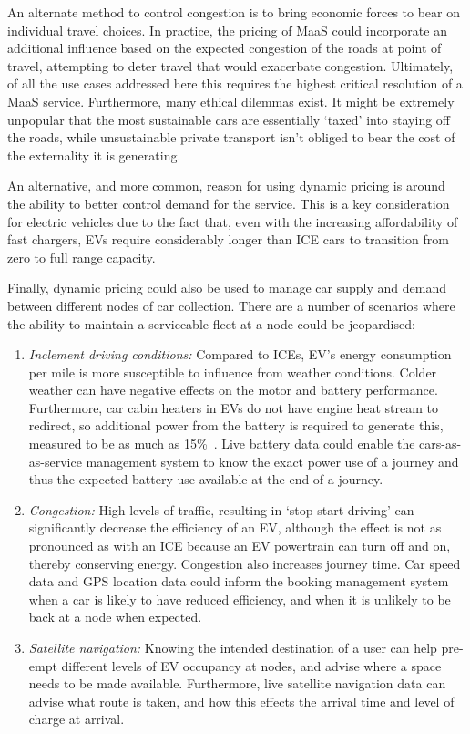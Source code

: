 \documentclass[b5paper,10pt]{article}
\begin{document}
An alternate method to control congestion is to bring economic forces
to bear on individual travel choices. In practice, the pricing of MaaS
could incorporate an additional influence based on the expected
congestion of the roads at point of travel, attempting to deter travel
that would exacerbate congestion. Ultimately, of all the use cases
addressed here this requires the highest critical resolution of a MaaS
service. Furthermore, many ethical dilemmas exist. It might be
extremely unpopular that the most sustainable cars are essentially
`taxed' into staying off the roads, while unsustainable private
transport isn't obliged to bear the cost of the externality it is
generating.

An alternative, and more common, reason for using dynamic pricing is
around the ability to better control demand for the service. This is a
key consideration for electric vehicles due to the fact that, even
with the increasing affordability of fast chargers, EVs require
considerably longer than ICE cars to transition from zero to full
range capacity.

Finally, dynamic pricing could also be used to manage car supply and
demand between different nodes of car collection. There are a number
of scenarios where the ability to maintain a serviceable fleet at a
node could be jeopardised:

\begin{enumerate}
\item {\emph{Inclement driving conditions:}} Compared to ICEs, EV's
energy consumption per mile is more susceptible to influence from
weather conditions. Colder weather can have negative effects on the
motor and battery performance. Furthermore, car cabin heaters in EVs
do not have engine heat stream to redirect, so additional power from
the battery is required to generate this, measured to be as much as
15\%~\citep{dft:2008,brook:2015}. Live battery data could enable the
cars-as-as-service management system to know the exact power use of a
journey and thus the expected battery use available at the end of a
journey.
\item {\emph{Congestion:}} High levels of traffic, resulting in
`stop-start driving' can significantly decrease the efficiency of an
EV, although the effect is not as pronounced as with an ICE because an EV
powertrain can turn off and on, thereby conserving energy. Congestion also
increases journey time. Car speed data and GPS location data could
inform the booking management system when a car is likely to have
reduced efficiency, and when it is unlikely to be back at a node when
expected.
\item {\emph{Satellite navigation:}} Knowing the intended destination
of a user can help pre-empt different levels of EV occupancy at nodes,
and advise where a space needs to be made available. Furthermore, live
satellite navigation data can advise what route is taken, and how this
effects the arrival time and level of charge at arrival.
\end{enumerate}
\end{document}
